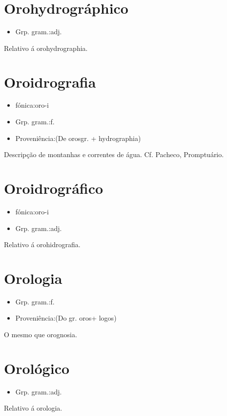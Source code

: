 \section{Orohydrográphico}
\begin{itemize}
\item {Grp. gram.:adj.}
\end{itemize}
Relativo á orohydrographia.
\section{Oroidrografia}
\begin{itemize}
\item {fónica:oro-i}
\end{itemize}
\begin{itemize}
\item {Grp. gram.:f.}
\end{itemize}
\begin{itemize}
\item {Proveniência:(De \textunderscore oros\textunderscore  gr. + \textunderscore hydrographia\textunderscore )}
\end{itemize}
Descripção de montanhas e correntes de água. Cf. Pacheco, \textunderscore Promptuário\textunderscore .
\section{Oroidrográfico}
\begin{itemize}
\item {fónica:oro-i}
\end{itemize}
\begin{itemize}
\item {Grp. gram.:adj.}
\end{itemize}
Relativo á orohidrografia.
\section{Orologia}
\begin{itemize}
\item {Grp. gram.:f.}
\end{itemize}
\begin{itemize}
\item {Proveniência:(Do gr. \textunderscore oros\textunderscore  + \textunderscore logos\textunderscore )}
\end{itemize}
O mesmo que \textunderscore orognosia\textunderscore .
\section{Orológico}
\begin{itemize}
\item {Grp. gram.:adj.}
\end{itemize}
Relativo á orologia.
